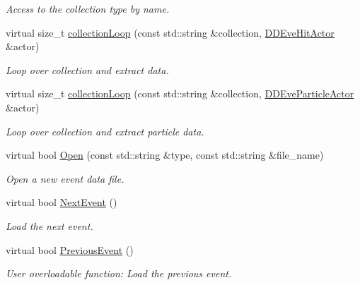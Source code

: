 \begin{DoxyCompactItemize}
\begin{DoxyCompactList}\small\item\em Access to the collection type by name. \item\end{DoxyCompactList}\item 
virtual size\_\-t \hyperlink{class_d_d4hep_1_1_generic_event_handler_ad521db17296b0abb05294f61f83b2019}{collectionLoop} (const std::string \&collection, \hyperlink{struct_d_d4hep_1_1_d_d_eve_hit_actor}{DDEveHitActor} \&actor)
\begin{DoxyCompactList}\small\item\em Loop over collection and extract data. \item\end{DoxyCompactList}\item 
virtual size\_\-t \hyperlink{class_d_d4hep_1_1_generic_event_handler_a401b32a86d996b71baa133c4f4b00709}{collectionLoop} (const std::string \&collection, \hyperlink{struct_d_d4hep_1_1_d_d_eve_particle_actor}{DDEveParticleActor} \&actor)
\begin{DoxyCompactList}\small\item\em Loop over collection and extract particle data. \item\end{DoxyCompactList}\item 
virtual bool \hyperlink{class_d_d4hep_1_1_generic_event_handler_a2ad81c03ef6feac9bf399ccd5928da41}{Open} (const std::string \&type, const std::string \&file\_\-name)
\begin{DoxyCompactList}\small\item\em Open a new event data file. \item\end{DoxyCompactList}\item 
virtual bool \hyperlink{class_d_d4hep_1_1_generic_event_handler_a0dc8d4d5dde63d3278f67da79e86b590}{NextEvent} ()
\begin{DoxyCompactList}\small\item\em Load the next event. \item\end{DoxyCompactList}\item 
virtual bool \hyperlink{class_d_d4hep_1_1_generic_event_handler_a4b833d9537c7c29b0bfb0d567f98d0a3}{PreviousEvent} ()
\begin{DoxyCompactList}\small\item\em User overloadable function: Load the previous event. \item\end{DoxyCompactList}\item 

\end{DoxyCompactItemize}
